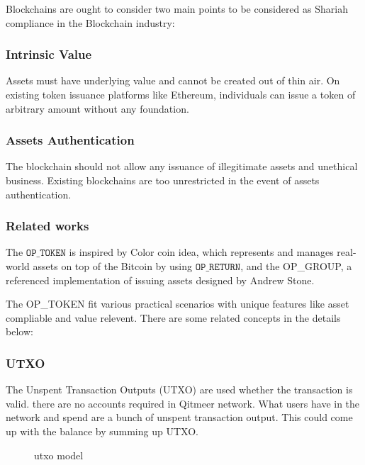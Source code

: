 \documentclass[a4paper,11pt]{article}
\begin{document}
Blockchains are ought to consider two main points to be considered as Shariah compliance in the Blockchain industry:

\subsubsection*{Intrinsic Value}
Assets must have underlying value and cannot be created out of thin air. On existing token issuance platforms like Ethereum\cite{Ethereum}, individuals can issue a token of arbitrary amount without any foundation.
 

\subsubsection*{Assets Authentication}
The blockchain should not allow any issuance of illegitimate assets and unethical business. Existing blockchains are too unrestricted in the event of assets authentication.

\subsubsection{Related works}

The $\texttt{OP\_TOKEN}$ is inspired by Color coin idea, which represents and manages real-world assets on top of the Bitcoin by using $\texttt{OP\_RETURN}$, and the OP\_GROUP, a referenced implementation of issuing assets designed by Andrew Stone.

The OP\_TOKEN fit various practical scenarios with unique features like asset compliable and value relevent. There are some related concepts in the details below:

\subsubsection*{UTXO}

The Unspent Transaction Outputs (UTXO) are used whether the transaction is valid. there are no accounts required in Qitmeer network. What users have in the network and spend are a bunch of unspent transaction output. This could come up with the balance by summing up UTXO.

\begin{figure}[hbt]
	\centerline{%
	}
\caption{utxo model}
\end{figure}
\end{document}

